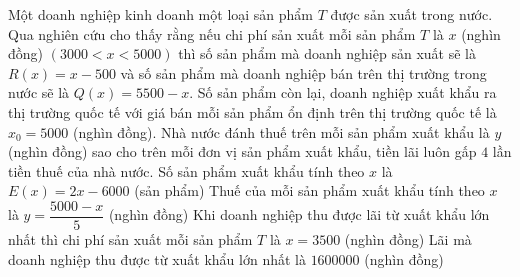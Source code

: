 \begin{ex}
	Một doanh nghiệp kinh doanh một loại sản phẩm $T$ được sản xuất trong nước. Qua nghiên cứu cho thấy rằng nếu chi phí sản xuất mỗi sản phẩm $T$ là $x$ (nghìn đồng) $(3000<x<5000)$ thì số sản phẩm mà doanh nghiệp sản xuất sẽ là $R(x)=x-500$ và số sản phẩm mà doanh nghiệp bán trên thị trường trong nước sẽ là $Q(x)=5500-x$. Số sản phẩm còn lại, doanh nghiệp xuất khẩu ra thị trường quốc tế với giá bán mỗi sản phẩm ổn định trên thị trường quốc tế là $x_0=5000$ (nghìn đồng). Nhà nước đánh thuế trên mỗi sản phẩm xuất khẩu là $y$ (nghìn đồng) sao cho trên mỗi đơn vị sản phẩm xuất khẩu, tiền lãi luôn gấp $4$ lần tiền thuế của nhà nước.
	\choiceTF
	{\True Số sản phẩm xuất khẩu tính theo $x$ là $E(x)=2x-6000$ (sản phẩm)}
	{\True Thuế của mỗi sản phẩm xuất khẩu tính theo $x$ là $y=\dfrac{5000-x}{5}$ (nghìn đồng)}
	{Khi doanh nghiệp thu được lãi từ xuất khẩu lớn nhất thì chi phí sản xuất mỗi sản phẩm $T$ là $x=3500$ (nghìn đồng)}
	{\True Lãi mà doanh nghiệp thu được từ xuất khẩu lớn nhất là $1600000$ (nghìn đồng)}
\end{ex}

